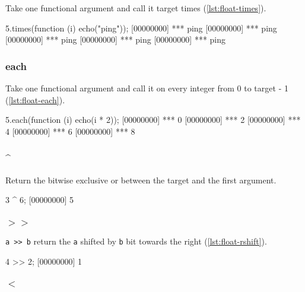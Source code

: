 Take one functional argument and call it target times (\autoref{lst:float-times}).

\begin{urbiscript}[caption=Float.times, label=lst:float-times,
  float=\floatposh]
5.times(function (i) { echo("ping")});
[00000000] *** ping
[00000000] *** ping
[00000000] *** ping
[00000000] *** ping
[00000000] *** ping
\end{urbiscript}

\subsubsection{each}

Take one functional argument and call it on every integer from 0 to
target - 1 (\autoref{lst:float-each}).

\begin{urbiscript}[caption=Float.each, label=lst:float-each,
  float=\floatposh]
5.each(function (i) { echo(i * 2)});
[00000000] *** 0
[00000000] *** 2
[00000000] *** 4
[00000000] *** 6
[00000000] *** 8
\end{urbiscript}

\subsubsection{\^{}}

Return the bitwise exclusive or between the target and the first argument.

\begin{urbiscript}[caption=Float.'\^{}', label=lst:float-bitxor,
  float=\floatposh]
3 ^ 6;
[00000000] 5
\end{urbiscript}

\subsubsection{$>>$}

\lstinline|a >> b| return the \lstinline|a| shifted by \lstinline|b|
bit towards the right (\autoref{lst:float-rshift}).

\begin{urbiscript}[caption=Float.'$>>$', label=lst:float-rshift,
  float=\floatposh]
4 >> 2;
[00000000] 1
\end{urbiscript}

\subsubsection{$<$}

